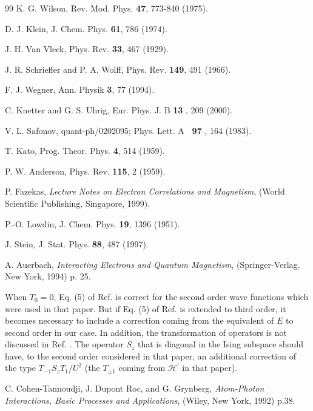 \documentclass[floatfix,twocolumn,aps,prb,showpacs,superscriptaddress]{revtex4}
\begin{document}
\begin{thebibliography}{99}
 K. G. Wilson, Rev. Mod. Phys. \textbf{47}, 773-840
(1975).


 D. J. Klein, J. Chem. Phys. \textbf{61}, 786 (1974).


 J. H. Van Vleck, Phys. Rev. \textbf{33}, 467 (1929).


 J. R. Schrieffer and P. A. Wolff, Phys. Rev. 
\textbf{149}, 491 (1966).


 F. J. Wegner, Ann. Physik \textbf{3}, 77 (1994).


 C. Knetter and G. S. Uhrig, Eur. Phys. J. B \textbf{13}%
, 209 (2000).


 V. L. Safonov, quant-ph/0202095; Phys. Lett. A \textbf{\ 97%
}, 164 (1983).


 T. Kato, Prog. Theor. Phys. \textbf{4}, 514 (1959).


 P. W. Anderson, Phys. Rev. \textbf{115}, 2 (1959).


 P. Fazekas, \textit{Lecture Notes on Electron Correlations
and Magnetism}, (World Scientific Publishing, Singapore, 1999).


 P.-O. Lowdin, J. Chem. Phys. \textbf{19}, 1396 (1951).


 J. Stein, J. Stat. Phys. \textbf{88}, 487 (1997).


 A. Auerbach, \textit{Interacting Electrons and Quantum
Magnetism}, (Springer-Verlag, New York, 1994) p. 25.


 When $T_{0}=0$, Eq. (5) of Ref. %
 is correct for the second order wave functions
which were used in that paper. But if Eq. (5) of Ref. %
 is extended to third order, it becomes necessary
to include a correction coming from the equivalent of $E$ to second order in
our case. In addition, the transformation of operators is not discussed in Ref. %
. The operator $S_{z}$ that is diagonal in the
Ising subspace should have, to the second order considered in that paper, an
additional correction of the type $T_{-1}S_{z}T_{1}/U^{2}$ (the $T_{\pm 1}$
coming from $\mathcal{H}^{\prime }$ in that paper).


 C. Cohen-Tannoudji, J. Dupont Roc, and G. Grynberg, \textit{%
Atom-Photon Interactions, Basic Processes and Applications}, (Wiley, New
York, 1992) p.38.



\end{thebibliography}
\end{document}
